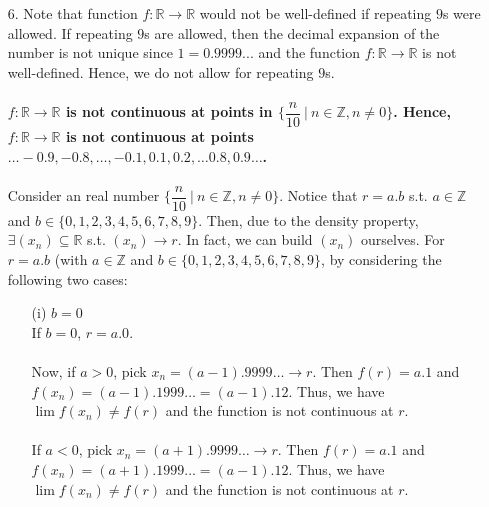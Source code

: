 \documentclass[11pt]{article}
\DeclarePairedDelimiter\abs{\lvert}{\rvert}%
\newcommand{\reals}{\mathbb{R}}
\newcommand{\ints}{\mathbb{Z}}
\begin{document}
\begin{itemize}
        Thus, we have now shown that $\forall c \in [0, \infty)$ and
        $\forall \epsilon > 0, \exists \delta > 0$ s.t. whenever
        $\abs{x - c} < \delta$ (with $x \in [0, \infty)$), it follows that
        $\abs{\sqrt[4]{x} - \sqrt[4]{c}} < \epsilon$.\\
        $\qed$

    \item[6.]
        Note that function $f : \reals \to \reals$ would not be well-defined if
        repeating $9$s were allowed. If repeating $9$s are allowed, then the
        decimal expansion of the number is not unique since $1 = 0.9999...$ and
        the function $f : \reals \to \reals$ is not well-defined. Hence, we do
        not allow for repeating $9$s.
        \\
        \\
        \textbf{$f : \reals \to \reals$ is not continuous at points in
        $\Big\{\dfrac{n}{10} \ \big| \ n \in \ints, n \neq 0 \Big\}$. Hence, $f
        : \reals \to \reals$ is not continuous at points $\dots -0.9, -0.8,
        \dots, -0.1, 0.1, 0.2, \dots 0.8, 0.9 \dots$.}
        \\
        \\
        Consider an real number $\Big\{\dfrac{n}{10} \ \big| \ n \in \ints, n
        \neq 0 \Big\}$. Notice that $r = a.b$ s.t. $a \in \ints$ and $b \in
        \{0, 1, 2, 3, 4, 5, 6, 7, 8, 9\}$. Then, due to the density property,
        $\exists (x_n) \subseteq \reals$ s.t. $(x_n) \to r$. In fact, we can
        build $(x_n)$ ourselves. For $r = a.b$ (with $a \in \ints$ and $b \in
        \{0, 1, 2, 3, 4, 5, 6, 7, 8, 9\}$, by considering the following two
        cases:
        \begin{itemize}
            \item[(i)]
                $b = 0$
                \\
                If $b = 0$, $r = a.0$.
                \\
                \\
                Now, if $a > 0$, pick $x_n = (a - 1).9999\dots \to r$. Then
                $f(r) = a.1$ and $f(x_n) = (a - 1).1999\dots = (a - 1).12$.
                Thus, we have $\lim{f(x_n)} \neq f(r)$ and the function is not
                continuous at $r$.
                \\
                \\
                If $a < 0$, pick $x_n = (a + 1).9999\dots \to r$. Then $f(r) =
                a.1$ and $f(x_n) = (a + 1).1999\dots = (a - 1).12$. Thus, we
                have $\lim{f(x_n)} \neq f(r)$ and the function is not
                continuous at $r$.


\end{itemize}
\end{itemize}
\end{document}
